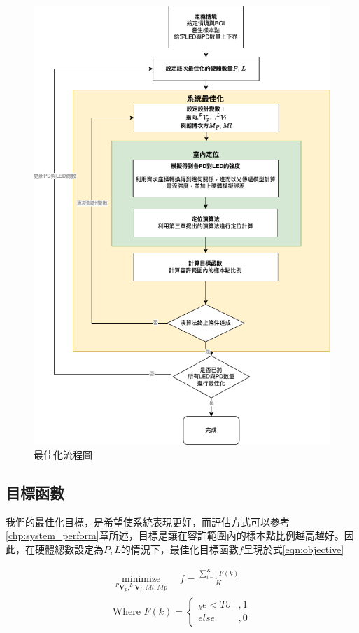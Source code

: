 \begin{figure}[h!]
    \centering
    \includegraphics[width=13cm]{ch5pic/optimize_flow.png}
    \caption{最佳化流程圖}
    \label{pic:optimize_flow}
\end{figure}

    \subsection{目標函數}

    我們的最佳化目標，是希望使系統表現更好，而評估方式可以參考\ref{chp:system_perform}章所述，目標是讓在容許範圍內的樣本點比例越高越好。因此，在硬體總數設定為$P,L$的情況下，最佳化目標函數$f$呈現於式\ref{eqn:objective}

    \begin{equation}
        \label{eqn:objective}
        \begin{aligned}
        \underset{^{P}\boldsymbol{V}_p, ^{L}\boldsymbol{V}_l,Ml,Mp}{\operatorname{minimize}} 
        \quad f = 
        \frac{\sum_{i=1}^{K}F(k)}{K}  \\
        \text{Where }F(k)=
        \begin{cases}
            _{k}e<To&,1\\
            else&,0
        \end{cases}
        \end{aligned}
    \end{equation}

